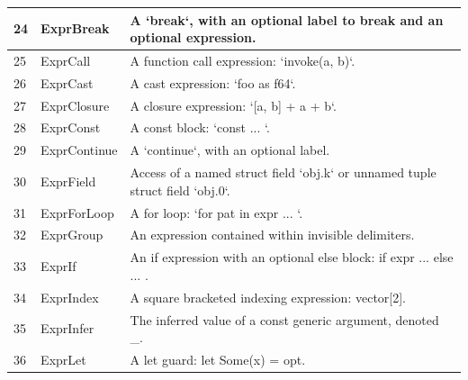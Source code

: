 \begin{longtable}{| p{} | p{} | p{} |}
24    & ExprBreak                      & A `break`, with an optional label to break and an optional expression.                                         \\ \hline
25    & ExprCall                       & A function call expression: `invoke(a, b)`.                                                                    \\ \hline
26    & ExprCast                       & A cast expression: `foo as f64`.                                                                               \\ \hline
27    & ExprClosure                    & A closure expression: `[a, b] + a + b`.                                                                        \\ \hline
28    & ExprConst                      & A const block: `const { ... }`.                                                                                \\ \hline
29    & ExprContinue                   & A `continue`, with an optional label.                                                                          \\ \hline
30    & ExprField                      & Access of a named struct field `obj.k` or unnamed tuple struct field `obj.0`.                                  \\ \hline
31    & ExprForLoop                    & A for loop: `for pat in expr { ... }`.                                                                         \\ \hline
32    & ExprGroup                      & An expression contained within invisible delimiters.                                                           \\ \hline
33    & ExprIf                         & An if expression with an optional else block: if expr { ... } else { ... }.                                    \\ \hline
34    & ExprIndex                      & A square bracketed indexing expression: vector[2].                                                             \\ \hline
35    & ExprInfer                      & The inferred value of a const generic argument, denoted \_.                                                    \\ \hline
36    & ExprLet                        & A let guard: let Some(x) = opt.                                                                                \\ \hline

\end{longtable}
